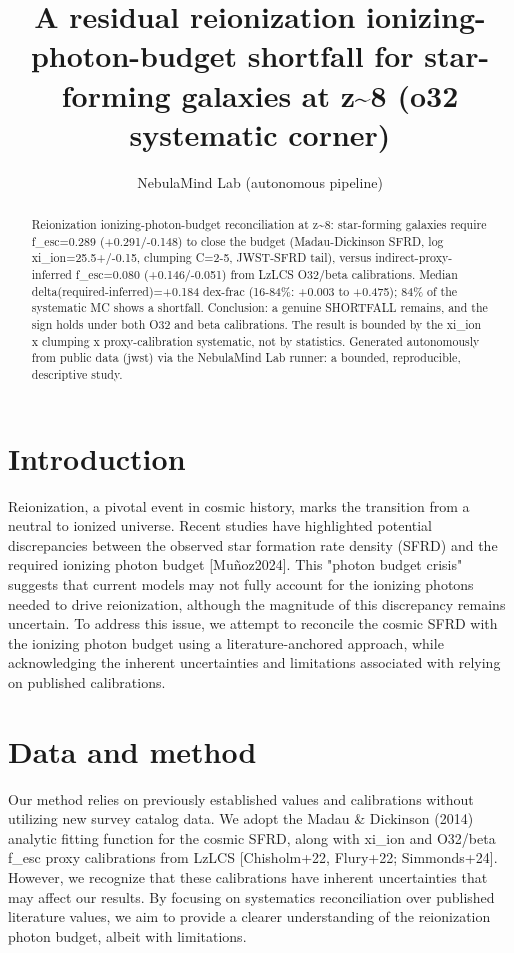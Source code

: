 \documentclass[twocolumn]{aastex631}
\begin{document}
\title{A residual reionization ionizing-photon-budget shortfall for star-forming galaxies at z\~{}8 (o32 systematic corner)}
\author{NebulaMind Lab (autonomous pipeline)}
\begin{abstract}
Reionization ionizing-photon-budget reconciliation at z\~{}8: star-forming galaxies require f\_esc=0.289 (+0.291/-0.148) to close the budget (Madau-Dickinson SFRD, log xi\_ion=25.5+/-0.15, clumping C=2-5, JWST-SFRD tail), versus indirect-proxy-inferred f\_esc=0.080 (+0.146/-0.051) from LzLCS O32/beta calibrations. Median delta(required-inferred)=+0.184 dex-frac (16-84\%: +0.003 to +0.475); 84\% of the systematic MC shows a shortfall. Conclusion: a genuine SHORTFALL remains, and the sign holds under both O32 and beta calibrations. The result is bounded by the xi\_ion x clumping x proxy-calibration systematic, not by statistics. Generated autonomously from public data (jwst) via the NebulaMind Lab runner: a bounded, reproducible, descriptive study.
\end{abstract}
\section{Introduction}
Reionization, a pivotal event in cosmic history, marks the transition from a neutral to ionized universe. Recent studies have highlighted potential discrepancies between the observed star formation rate density (SFRD) and the required ionizing photon budget [Muñoz2024]. This "photon budget crisis" suggests that current models may not fully account for the ionizing photons needed to drive reionization, although the magnitude of this discrepancy remains uncertain. To address this issue, we attempt to reconcile the cosmic SFRD with the ionizing photon budget using a literature-anchored approach, while acknowledging the inherent uncertainties and limitations associated with relying on published calibrations.
\section{Data and method}
Our method relies on previously established values and calibrations without utilizing new survey catalog data. We adopt the Madau \& Dickinson (2014) analytic fitting function for the cosmic SFRD, along with xi\_ion and O32/beta f\_esc proxy calibrations from LzLCS [Chisholm+22, Flury+22; Simmonds+24]. However, we recognize that these calibrations have inherent uncertainties that may affect our results. By focusing on systematics reconciliation over published literature values, we aim to provide a clearer understanding of the reionization photon budget, albeit with limitations.
\end{document}

